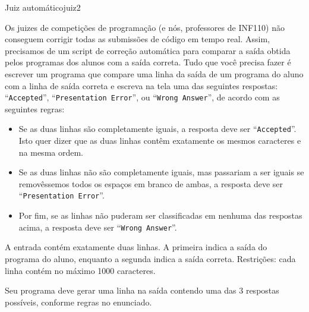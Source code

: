 \documentclass[12pt,a4paper,oneside]{article}
\begin{document}
\begin{problem}{Juiz automático}{juiz}{2}

Os juizes de competições de programação (e nós, professores de INF110) não conseguem corrigir todas as submissões de código em tempo real. Assim, precisamos de um script de correção automática para comparar a saída obtida pelos programas dos alunos com a saída correta. Tudo que você precisa fazer é escrever um programa que compare uma linha da saída de um programa do aluno com a linha de saída correta e escreva na tela uma das seguintes respostas: ``\texttt{Accepted}'', ``\texttt{Presentation Error}'', ou ``\texttt{Wrong Answer}'', de acordo com as seguintes regras:

\begin{itemize}
    \item Se as duas linhas são completamente iguais, a resposta deve ser ``\texttt{Accepted}''. Isto quer dizer que as duas linhas contêm exatamente os mesmos caracteres e na mesma ordem.
    \item Se as duas linhas não são completamente iguais, mas passariam a ser iguais se removêssemos todos os espaços em branco de ambas, a resposta deve ser ``\texttt{Presentation Error}''.
    \item Por fim, se as linhas não puderam ser classificadas em nenhuma das respostas acima, a resposta deve ser ``\texttt{Wrong Answer}''.
\end{itemize}

%

\InputFile

A entrada contém exatamente duas linhas. A primeira indica a saída do programa do aluno, enquanto a segunda indica a saída correta. Restrições: cada linha contém no máximo 1000 caracteres.

\OutputFile

Seu programa deve gerar uma linha na saída contendo uma das 3 respostas possíveis, conforme regras no enunciado.


\Example

\begin{example}
%
\end{example}

\begin{example}
%
\end{example}

\begin{example}
%
\end{example}

\begin{example}
%
\end{example}




\end{problem}
\end{document}

